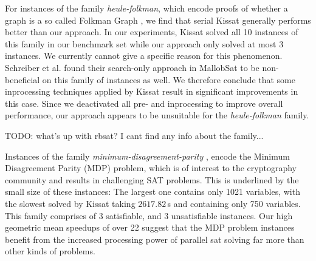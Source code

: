 \documentclass[12pt,a4paper,twoside]{scrartcl}
\numberwithin{equation}{section}
\begin{document}
For instances of the family \textit{heule-folkman}, which encode proofs of whether a graph is a so called Folkman Graph \cite{satComp2024}, we find that serial Kissat generally performs better than our approach. In our experiments, Kissat solved all 10 instances of this family in our benchmark set while our approach only solved at most 3 instances. We currently cannot give a specific reason for this phenomenon. Schreiber et al. \cite{searchOnlyPaper} found their search-only approach in MallobSat to be non-beneficial on this family of instances as well. We therefore conclude that some inprocessing techniques applied by Kissat result in significant improvements in this case. Since we deactivated all pre- and inprocessing to improve overall performance, our approach appears to be unsuitable for the \textit{heule-folkman} family.

TODO: what's up with rbsat? I cant find any info about the family...

Instances of the family \textit{minimum-disagreement-parity} \cite{satComp2022}, encode the Minimum Disagreement Parity (MDP) problem, which is of interest to the cryptography community and results in challenging SAT problems. This is underlined by the small size of these instances: The largest one contains only 1021 variables, with the slowest solved by Kissat taking $2617.82\,$s and containing only 750 variables. This family comprises of 3 satisfiable, and 3 unsatisfiable instances. Our high geometric mean speedups of over 22 suggest that the MDP problem instances benefit from the increased processing power of parallel sat solving far more than other kinds of problems.
\end{document}
